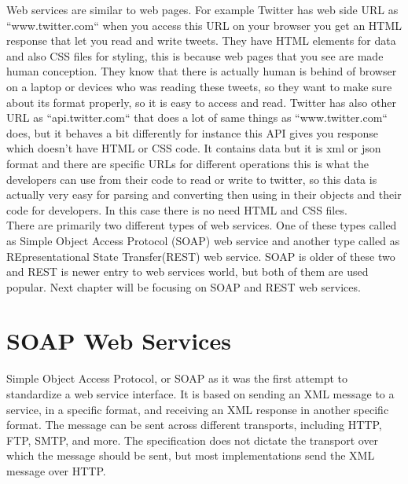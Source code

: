 Web services are similar to web pages. For example Twitter has web side URL as “www.twitter.com“ when you access this URL on
your browser you get an HTML response that let you read and write tweets. They have HTML elements for data and also CSS files
for styling, this is because web pages that you see are made human conception. They know that there is actually human is behind
of browser on a laptop or devices who was reading these tweets, so they want to make sure about its format properly, so it is easy to access and read.
Twitter has also other URL as “api.twitter.com“ that does a lot of same things as “www.twitter.com“ does, but it behaves a bit
differently for instance this API gives you response which doesn’t have HTML or CSS code. It contains data but it is xml or json format and there are specific URLs for different operations this is what the developers can use from their code to read or write to twitter, so this data is actually very easy for parsing and converting then using in their objects and their code for developers. In this case there is no need HTML and CSS files.\\
There are primarily two different types of web services. One of these types called as  Simple Object Access Protocol (SOAP) web
service and another type called as REpresentational State Transfer(REST) web service. SOAP is older of these two and REST is newer entry to web services world, but both of them are used popular.
Next chapter will be focusing on SOAP and REST web services.

\section{SOAP Web Services}
\label{section:soa}

Simple Object Access Protocol, or SOAP as it was the first attempt to standardize a web service interface. It is based on
sending an XML message to a service, in a specific format, and receiving an XML response in another specific format.
The message can be sent across different transports, including HTTP, FTP, SMTP, and more. The specification does not
dictate the transport over which the message should be sent, but most implementations send the XML message over HTTP.\\

